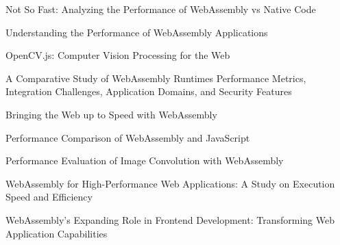 
Not So Fast: Analyzing the Performance of WebAssembly vs Native Code


Understanding the Performance of WebAssembly Applications


OpenCV.js: Computer Vision Processing for the Web


A Comparative Study of WebAssembly Runtimes Performance Metrics, Integration Challenges, Application Domains, and Security Features


Bringing the Web up to Speed with WebAssembly


Performance Comparison of WebAssembly and JavaScript


Performance Evaluation of Image Convolution with WebAssembly


WebAssembly for High-Performance Web Applications: A Study on Execution Speed and Efficiency


WebAssembly’s Expanding Role in Frontend Development: Transforming Web Application Capabilities
